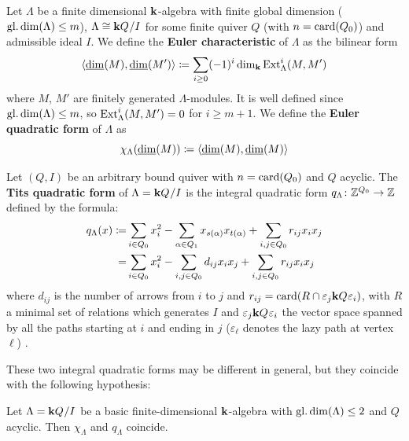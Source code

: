 \begin{definition}
	Let $\Lambda$ be a finite dimensional $\mathbf{k}$-algebra with finite global dimension ($\operatorname{gl.dim}(\Lambda)\leq m$), $\Lambda\cong \mathbf{k} Q_{}/I$ for some finite quiver $Q$ (with $n= \operatorname{card}(Q_0)$) and admissible ideal $I$. We define the \textbf{Euler characteristic} of $\Lambda$ as the bilinear form 
	\[
	\langle \underline{\dim}(M),\underline{\dim}(M')\rangle \coloneqq \sum_{i\geq0} (-1)^i \dim_{\mathbf{k}} \operatorname{Ext}_{\Lambda}^i(M,M')  
	\]
	where $M$, $M'$ are finitely generated $\Lambda$-modules. It is well defined since $\operatorname{gl.dim}(\Lambda)\leq m$, so $\operatorname{Ext}_{\Lambda}^i(M,M')=0$ for $i\geq m+1$. We define the \textbf{Euler quadratic form} of $\Lambda$ as
	\[\chi_\Lambda(\underline{\dim}(M))\coloneqq \langle \underline{\dim}(M),\underline{\dim}(M)\rangle\]
\end{definition}

\begin{definition}
	Let $(Q,I)$ be an arbitrary bound quiver with $n=\operatorname{card}(Q_0)$ and $Q$ acyclic. The \textbf{Tits quadratic form} of $\Lambda=\mathbf{k} Q_{}/I$ is the integral quadratic form $q_\Lambda \colon \mathbb{Z}^{Q_0} \to \mathbb{Z}$ defined by the formula:
	\[
	\begin{aligned}
		q_\Lambda(x)\coloneqq& \sum_{i\in Q_0} x_i^2 - \sum_{\alpha\in Q_1} x_{s(\alpha)} x_{t(\alpha)} + \sum_{i,j \in Q_0} r_{ij} x_i x_j \\
		=& \sum_{i\in Q_0} x_i^2 - \sum_{i,j\in Q_0} d_{ij} x_i x_j + \sum_{i,j \in Q_0} r_{ij} x_i x_j
	\end{aligned}
	\]
	where $d_{ij}$ is the number of arrows from $i$ to $j$ and $r_{ij} = \operatorname{card}(R\cap \varepsilon_j \mathbf{k} Q_{} \varepsilon_i)$, with $R$ a minimal set of relations which generates $I$ and $\varepsilon_j \mathbf{k} Q_{} \varepsilon_i$ the vector space spanned by all the paths starting at $i$ and ending in $j$ ($\varepsilon_\ell$ denotes the lazy path at vertex $\ell$) .
\end{definition}

These two integral quadratic forms may be different in general, but they coincide with the following hypothesis:

\begin{theorem}\label{thm:eulertits}
	Let $\Lambda =\mathbf{k} Q_{}/I$ be a basic finite-dimensional $\mathbf{k}$-algebra  with $\operatorname{gl.dim}(\Lambda)\leq 2$ and $Q$ acyclic.  Then $\chi_\Lambda$ and $q_\Lambda$ coincide.
\end{theorem}

